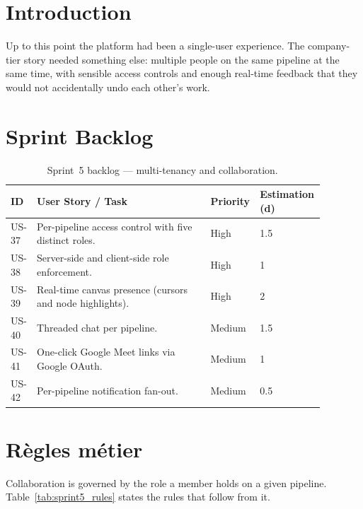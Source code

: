 \documentclass[12pt, a4paper, oneside]{report}
\begin{document}
\section*{Introduction}

Up to this point the platform had been a single-user experience.
The company-tier story needed something else: multiple people on the
same pipeline at the same time, with sensible access controls and
enough real-time feedback that they would not accidentally undo each
other's work.

\section{Sprint Backlog}

\begin{table}[H]
\centering
\caption{Sprint~5 backlog --- multi-tenancy and collaboration.}
\label{tab:sprint5_backlog}
\begin{tabular}{|p{0.05\linewidth}|L{0.55\linewidth}|p{0.1\linewidth}|p{0.18\linewidth}|}
\hline
\textbf{ID} & \textbf{User Story / Task} & \textbf{Priority} & \textbf{Estimation (d)} \\
\hline
US-37 & Per-pipeline access control with five distinct roles. & High & 1.5 \\ \hline
US-38 & Server-side and client-side role enforcement. & High & 1 \\ \hline
US-39 & Real-time canvas presence (cursors and node highlights). & High & 2 \\ \hline
US-40 & Threaded chat per pipeline. & Medium & 1.5 \\ \hline
US-41 & One-click Google Meet links via Google OAuth. & Medium & 1 \\ \hline
US-42 & Per-pipeline notification fan-out. & Medium & 0.5 \\
\hline
\end{tabular}
\end{table}

\section{Règles métier}

Collaboration is governed by the role a member holds on a given
pipeline. Table~\ref{tab:sprint5_rules} states the rules that follow
from it.
\end{document}
